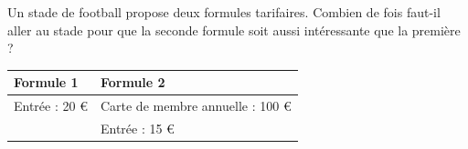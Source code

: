 %
%

    Un stade de football propose deux formules tarifaires. Combien de fois
    faut-il aller au stade pour que la seconde formule soit aussi intéressante
    que la première ?
    \begin{center}
        \begin{tabularx}{.9\linewidth}{YY}
            \toprule
            \textbf{Formule 1} & \textbf{Formule 2}               \\
            \midrule
            Entrée : 20 €      & Carte de membre annuelle : 100 € \\
                               & Entrée : 15 €                    \\
            \bottomrule
        \end{tabularx}
    \end{center}
